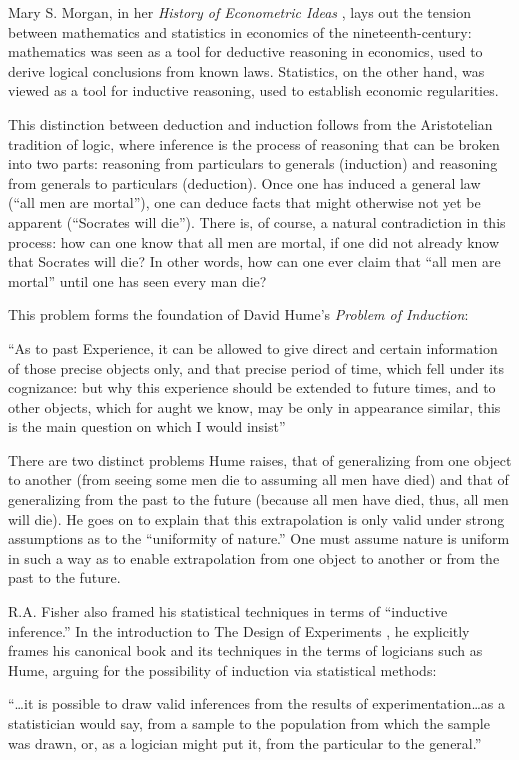 \documentclass[a4paper,12pt]{article}
\begin{document}
Mary S. Morgan, in her \textit{History of Econometric Ideas} \parencite*{Morgan1991}, lays out the tension between mathematics and statistics in economics of the nineteenth-century: mathematics was seen as a tool for deductive reasoning in economics, used to derive logical conclusions from known laws. Statistics, on the other hand, was viewed as a tool for inductive reasoning, used to establish economic regularities. 

This distinction between deduction and induction follows from the Aristotelian tradition of logic, where inference is the process of reasoning that can be broken into two parts: reasoning from particulars to generals (induction) and reasoning from generals to particulars (deduction). Once one has induced a general law (``all men are mortal''), one can deduce facts that might otherwise not yet be apparent (``Socrates will die''). There is, of course, a natural contradiction in this process: how can one know that all men are mortal, if one did not already know that Socrates will die? In other words, how can one ever claim that ``all men are mortal'' until one has seen every man die?

This problem forms the foundation of David Hume's \textit{Problem of Induction}:

\begin{displayquote}
``As to past Experience, it can be allowed to give direct and certain information of those precise objects only, and that precise period of time, which fell under its cognizance: but why this experience should be extended to future times, and to other objects, which for aught we know, may be only in appearance similar, this is the main question on which I would insist'' \parencite{hume1748}
\end{displayquote}

There are two distinct problems Hume raises, that of generalizing from one object to another (from seeing some men die to assuming all men have died) and that of generalizing from the past to the future (because all men have died, thus, all men will die). He goes on to explain that this extrapolation is only valid under strong assumptions as to the ``uniformity of nature.'' One must assume nature is uniform in such a way as to enable extrapolation from one object to another or from the past to the future.

R.A. Fisher also framed his statistical techniques in terms of ``inductive inference.'' In the introduction to The Design of Experiments \parencite*{Fisher1935}, he explicitly frames his canonical book and its techniques in the terms of logicians such as Hume, arguing for the possibility of induction via statistical methods:
%
\begin{displayquote}
``\ldots it is possible to draw valid inferences from the results of experimentation\ldots as a statistician would say, from a sample to the population from which the sample was drawn, or, as a logician might put it, from the particular to the general.'' \parencite{Fisher1935}
\end{displayquote}
\end{document}
